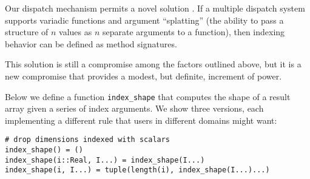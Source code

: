\iffalse
In a language with built-in multidimensional arrays, the compiler will
analyze indexing expressions and determine an answer using hard-coded
logic.
However, this approach is not satisfying: we would rather
implement the behavior in libraries, so that different kinds of arrays
may be defined, or so that rules of similar complexity may be
defined for other kinds of objects.
In fact different domains want different things.
Working with images, each dimension might be quite different, e.g.\ representing
time, space, or color, so you don't want to drop or rearrange dimensions very often.
Using compile time abstracton (templates) provides better performance, but
such libraries tend to be difficult to write (and read), and the full
complement of indexing behavior expected by technical users strains the
capabilities of such systems.
\fi

Our dispatch mechanism permits a novel solution \cite{Bezanson2014}.
If a multiple dispatch
system supports variadic functions and argument ``splatting'' (the ability
to pass a structure of $n$ values as $n$ separate arguments to a function),
then indexing behavior can be defined as method signatures.

This solution is still a compromise among the factors outlined above,
but it is a new compromise that provides a modest, but definite,
increment of power.

Below we define a function \texttt{index\_shape} that computes the
shape of a result array given a series of index arguments. We show
three versions, each implementing a different rule that users in
different domains might want:


\begin{singlespace}
\begin{verbatim}
# drop dimensions indexed with scalars
index_shape() = ()
index_shape(i::Real, I...) = index_shape(I...)
index_shape(i, I...) = tuple(length(i), index_shape(I...)...)
\end{verbatim}
\end{singlespace}

